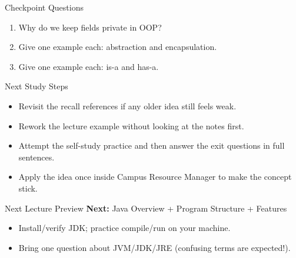 \documentclass{beamer}
\begin{document}
\begin{frame}{Checkpoint Questions}
  \begin{enumerate}[<+->]
    \item Why do we keep fields private in OOP?
    \item Give one example each: abstraction and encapsulation.
    \item Give one example each: is-a and has-a.
  \end{enumerate}
  \slidesources{\OOPSUnitISources}
\end{frame}

\begin{frame}{Next Study Steps}
\begin{itemize}[<+->]
  \item Revisit the recall references if any older idea still feels weak.
  \item Rework the lecture example without looking at the notes first.
  \item Attempt the self-study practice and then answer the exit questions in full sentences.
  \item Apply the idea once inside Campus Resource Manager to make the concept stick.
\end{itemize}
  \slidesources{\OOPSUnitISources}
\end{frame}

\begin{frame}{Next Lecture Preview}
  \textbf{Next:} Java Overview + Program Structure + Features
  \vspace{0.6em}
  \begin{itemize}[<+->]
    \item Install/verify JDK; practice compile/run on your machine.
    \item Bring one question about JVM/JDK/JRE (confusing terms are expected!).
  \end{itemize}
  \slidesources{\OOPSUnitISources}
\end{frame}
\end{document}

